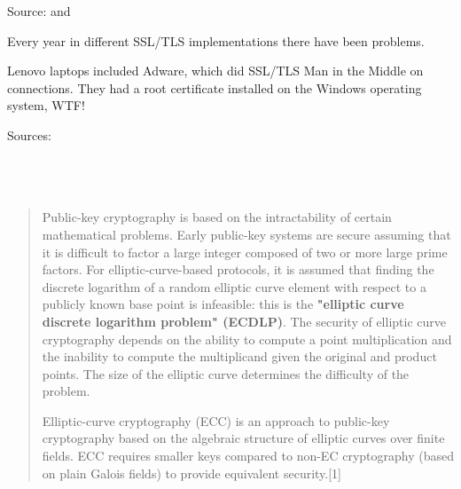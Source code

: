\documentclass[Screen16to9,17pt]{foils}
\begin{document}


Source:  and \\

Every year in different SSL/TLS implementations there have been problems.



Lenovo laptops included Adware, which did SSL/TLS Man in the Middle on connections.
They had a root certificate installed on the Windows operating system, WTF!

{\footnotesize Sources:\\
\\
\\
\\
}{\tiny{}
}




\begin{quote}
  Public-key cryptography is based on the intractability of certain mathematical problems. Early public-key systems are secure assuming that it is difficult to factor a large integer composed of two or more large prime factors. For elliptic-curve-based protocols, it is assumed that finding the discrete logarithm of a random elliptic curve element with respect to a publicly known base point is infeasible: this is the {\bf "elliptic curve discrete logarithm problem" (ECDLP)}. The security of elliptic curve cryptography depends on the ability to compute a point multiplication and the inability to compute the multiplicand given the original and product points. The size of the elliptic curve determines the difficulty of the problem.

Elliptic-curve cryptography (ECC) is an approach to public-key cryptography based on the algebraic structure of elliptic curves over finite fields. ECC requires smaller keys compared to non-EC cryptography (based on plain Galois fields) to provide equivalent security.[1]
\end{quote}
\end{document}
